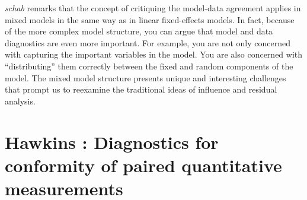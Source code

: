 \documentclass[12pt, a4paper]{report}
\begin{document}
\emph{schab} remarks that the concept of critiquing the model-data agreement applies in mixed models in the same way as in linear
fixed-effects models. In fact, because of the more complex model structure, you can argue that model and
data diagnostics are even more important. For example, you are not only concerned with capturing the
important variables in the model. You are also concerned with ``distributing” them correctly between the
fixed and random components of the model. The mixed model structure presents unique and interesting
challenges that prompt us to reexamine the traditional ideas of influence and residual analysis.

%	
%	



\section{Hawkins : Diagnostics for conformity of paired quantitative measurements}
\end{document}
